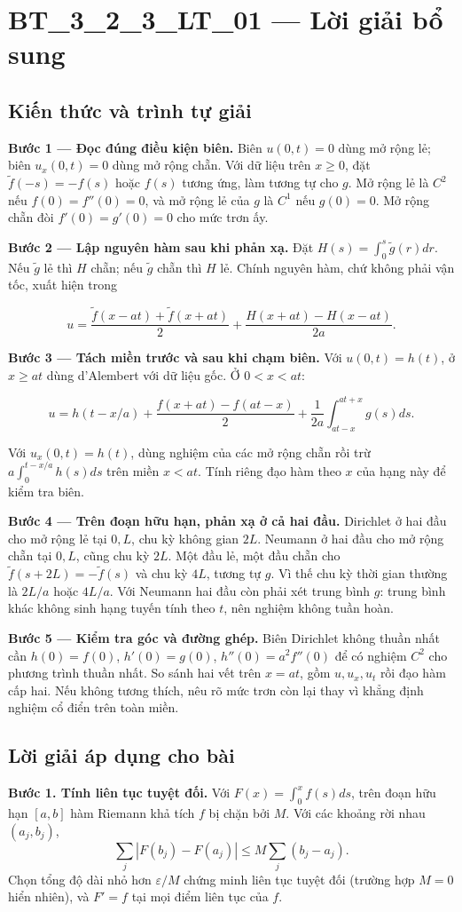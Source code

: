 \documentclass[10pt,a4paper]{article}
\begin{document}
\section*{BT\_3\_2\_3\_LT\_01 — Lời giải bổ sung}
\subsection*{Kiến thức và trình tự giải}
\textbf{Bước 1 — Đọc đúng điều kiện biên.} Biên $u(0,t)=0$ dùng mở rộng lẻ; biên $u_x(0,t)=0$ dùng mở rộng chẵn. Với dữ liệu trên $x\ge0$, đặt $\widetilde f(-s)=-f(s)$ hoặc $f(s)$ tương ứng, làm tương tự cho $g$. Mở rộng lẻ là $C^2$ nếu $f(0)=f''(0)=0$, và mở rộng lẻ của $g$ là $C^1$ nếu $g(0)=0$. Mở rộng chẵn đòi $f'(0)=g'(0)=0$ cho mức trơn ấy.

\textbf{Bước 2 — Lập nguyên hàm sau khi phản xạ.} Đặt $H(s)=\int_0^s\widetilde g(r)dr$. Nếu $\widetilde g$ lẻ thì $H$ chẵn; nếu $\widetilde g$ chẵn thì $H$ lẻ. Chính nguyên hàm, chứ không phải vận tốc, xuất hiện trong


\[
u=\frac{\widetilde f(x-at)+\widetilde f(x+at)}2+\frac{H(x+at)-H(x-at)}{2a}.
\]


\textbf{Bước 3 — Tách miền trước và sau khi chạm biên.} Với $u(0,t)=h(t)$, ở $x\ge at$ dùng d'Alembert với dữ liệu gốc. Ở $0<x<at$:


\[
u=h(t-x/a)+\frac{f(x+at)-f(at-x)}2+\frac1{2a}\int_{at-x}^{at+x}g(s)ds.
\]


Với $u_x(0,t)=h(t)$, dùng nghiệm của các mở rộng chẵn rồi trừ $a\int_0^{t-x/a}h(s)ds$ trên miền $x<at$. Tính riêng đạo hàm theo $x$ của hạng này để kiểm tra biên.

\textbf{Bước 4 — Trên đoạn hữu hạn, phản xạ ở cả hai đầu.} Dirichlet ở hai đầu cho mở rộng lẻ tại $0,L$, chu kỳ không gian $2L$. Neumann ở hai đầu cho mở rộng chẵn tại $0,L$, cũng chu kỳ $2L$. Một đầu lẻ, một đầu chẵn cho $\widetilde f(s+2L)=-\widetilde f(s)$ và chu kỳ $4L$, tương tự $g$. Vì thế chu kỳ thời gian thường là $2L/a$ hoặc $4L/a$. Với Neumann hai đầu còn phải xét trung bình $g$: trung bình khác không sinh hạng tuyến tính theo $t$, nên nghiệm không tuần hoàn.

\textbf{Bước 5 — Kiểm tra góc và đường ghép.} Biên Dirichlet không thuần nhất cần $h(0)=f(0)$, $h'(0)=g(0)$, $h''(0)=a^2f''(0)$ để có nghiệm $C^2$ cho phương trình thuần nhất. So sánh hai vết trên $x=at$, gồm $u,u_x,u_t$ rồi đạo hàm cấp hai. Nếu không tương thích, nêu rõ mức trơn còn lại thay vì khẳng định nghiệm cổ điển trên toàn miền.
\subsection*{Lời giải áp dụng cho bài}
\textbf{Bước 1. Tính liên tục tuyệt đối.} Với $F(x)=\int_0^xf(s)ds$, trên đoạn hữu hạn $[a,b]$ hàm Riemann khả tích $f$ bị chặn bởi $M$. Với các khoảng rời nhau $(a_j,b_j)$,
\[\sum_j|F(b_j)-F(a_j)|\le M\sum_j(b_j-a_j).\]
Chọn tổng độ dài nhỏ hơn $\varepsilon/M$ chứng minh liên tục tuyệt đối (trường hợp $M=0$ hiển nhiên), và $F'=f$ tại mọi điểm liên tục của $f$.
\end{document}
